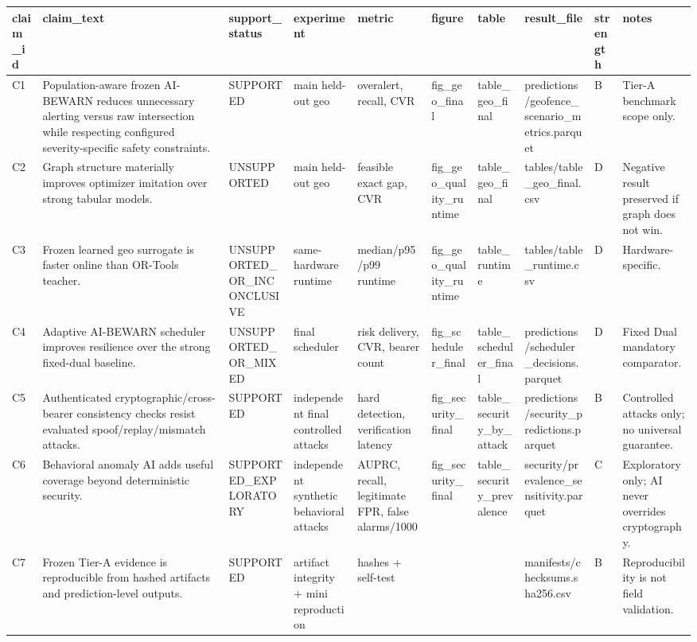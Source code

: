 \begin{tabular}{llllllllll}
\toprule
claim\_id & claim\_text & support\_status & experiment & metric & figure & table & result\_file & strength & notes \\
\midrule
C1 & Population-aware frozen AI-BEWARN reduces unnecessary alerting versus raw intersection while respecting configured severity-specific safety constraints. & SUPPORTED & main held-out geo & overalert, recall, CVR & fig\_geo\_final & table\_geo\_final & predictions/geofence\_scenario\_metrics.parquet & B & Tier-A benchmark scope only. \\
C2 & Graph structure materially improves optimizer imitation over strong tabular models. & UNSUPPORTED & main held-out geo & feasible exact gap, CVR & fig\_geo\_quality\_runtime & table\_geo\_final & tables/table\_geo\_final.csv & D & Negative result preserved if graph does not win. \\
C3 & Frozen learned geo surrogate is faster online than OR-Tools teacher. & UNSUPPORTED\_OR\_INCONCLUSIVE & same-hardware runtime & median/p95/p99 runtime & fig\_geo\_quality\_runtime & table\_runtime & tables/table\_runtime.csv & D & Hardware-specific. \\
C4 & Adaptive AI-BEWARN scheduler improves resilience over the strong fixed-dual baseline. & UNSUPPORTED\_OR\_MIXED & final scheduler & risk delivery, CVR, bearer count & fig\_scheduler\_final & table\_scheduler\_final & predictions/scheduler\_decisions.parquet & D & Fixed Dual mandatory comparator. \\
C5 & Authenticated cryptographic/cross-bearer consistency checks resist evaluated spoof/replay/mismatch attacks. & SUPPORTED & independent final controlled attacks & hard detection, verification latency & fig\_security\_final & table\_security\_by\_attack & predictions/security\_predictions.parquet & B & Controlled attacks only; no universal guarantee. \\
C6 & Behavioral anomaly AI adds useful coverage beyond deterministic security. & SUPPORTED\_EXPLORATORY & independent synthetic behavioral attacks & AUPRC, recall, legitimate FPR, false alarms/1000 & fig\_security\_final & table\_security\_prevalence & security/prevalence\_sensitivity.parquet & C & Exploratory only; AI never overrides cryptography. \\
C7 & Frozen Tier-A evidence is reproducible from hashed artifacts and prediction-level outputs. & SUPPORTED & artifact integrity + mini reproduction & hashes + self-test &  &  & manifests/checksums.sha256.csv & B & Reproducibility is not field validation. \\
\bottomrule
\end{tabular}
